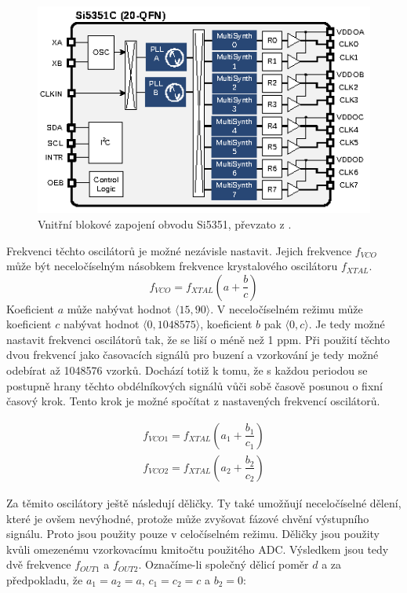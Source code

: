 \begin{figure}[htbp]
\includegraphics[width=\textwidth,keepaspectratio]{images/si5351_internal_architecture_overview.eps}\caption{Vnitřní blokové zapojení obvodu Si5351, převzato z \cite{Si5351datasheet}.} \label{si5351_internal_architecture_overview}
\end{figure}

Frekvenci těchto oscilátorů je možné nezávisle nastavit. Jejich frekvence $f_{VCO}$ může být neceločíselným násobkem frekvence krystalového oscilátoru $f_{XTAL}$.
\begin{equation}
f_{VCO}=f_{XTAL} \left(a+\dfrac{b}{c} \right)
\end{equation}
Koeficient $a$ může nabývat hodnot $\langle 15, 90 \rangle$. V neceločíselném režimu může koeficient $c$ nabývat hodnot $\langle 0, 1048575 \rangle$, koeficient $b$ pak $\langle 0, c \rangle$.
Je tedy možné nastavit frekvenci oscilátorů tak, že se liší o méně než 1 ppm. Při použití těchto dvou frekvencí jako časovacích signálů pro buzení a vzorkování je tedy možné odebírat až 1048576 vzorků. Dochází totiž k tomu, že s každou periodou se postupně hrany těchto obdélníkových signálů vůči sobě časově posunou o fixní časový krok. Tento krok je možné spočítat z nastavených frekvencí oscilátorů.

\begin{equation}
\begin{gathered}
f_{VCO1}=f_{XTAL} \left(a_1+\dfrac{b_1}{c_1} \right) \\
f_{VCO2}=f_{XTAL} \left(a_2+\dfrac{b_2}{c_2} \right)
\end{gathered}
\end{equation}

Za těmito oscilátory ještě následují děličky. Ty také umožňují neceločíselné dělení, které je ovšem nevýhodné, protože může zvyšovat fázové chvění výstupního signálu. Proto jsou použity pouze v celočíselném režimu. Děličky jsou použity kvůli omezenému vzorkovacímu kmitočtu použitého \acrshort{ADC}. Výsledkem jsou tedy dvě frekvence $f_{OUT1}$ a $f_{OUT2}$. Označíme-li společný dělicí poměr $d$ a za předpokladu, že $a_1=a_2=a$, $c_1=c_2=c$ a $b_2=0$:

